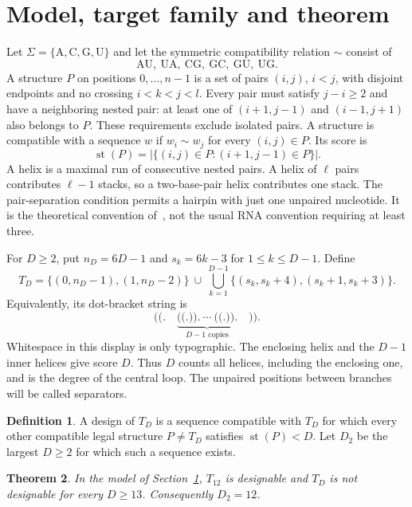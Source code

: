 \documentclass[11pt,a4paper]{article}
\newtheorem{theorem}{Theorem}
\theoremstyle{definition}
\newtheorem{definition}[theorem]{Definition}
\newcommand{\score}{\operatorname{st}}
\newcommand{\comp}{\mathrel{\sim}}
\begin{document}
\section{Model, target family and theorem}\label{sec:model}
Let $\Sigma=\{\mathrm A,\mathrm C,\mathrm G,\mathrm U\}$ and let the
symmetric compatibility relation $\comp$ consist of
\[
 \mathrm{AU},\ \mathrm{UA},\ \mathrm{CG},\ \mathrm{GC},\
 \mathrm{GU},\ \mathrm{UG}.
\]
A structure $P$ on positions $0,\ldots,n-1$ is a set of pairs $(i,j)$,
$i<j$, with disjoint endpoints and no crossing $i<k<j<l$.
Every pair must satisfy $j-i\geq2$ and have a neighboring nested pair:
at least one of $(i+1,j-1)$ and $(i-1,j+1)$ also belongs to $P$.
These requirements exclude isolated pairs. A structure is compatible
with a sequence $w$ if $w_i\comp w_j$ for every $(i,j)\in P$.
Its score is
\[
 \score(P)=\bigl|\{(i,j)\in P:(i+1,j-1)\in P\}\bigr|.
\]
A helix is a maximal run of consecutive nested pairs. A helix of
$\ell$ pairs contributes $\ell-1$ stacks, so a two-base-pair helix
contributes one stack. The pair-separation condition permits a
hairpin with just one unpaired nucleotide. It is the theoretical
convention of~\cite[Section~2]{BBP}, not the usual RNA convention
requiring at least three.

For $D\geq2$, put $n_D=6D-1$ and $s_k=6k-3$ for $1\leq k\leq D-1$.
Define
\begin{equation}\label{eq:target}
 T_D=\{(0,n_D-1),(1,n_D-2)\}
 \ \cup\ \bigcup_{k=1}^{D-1}\{(s_k,s_k+4),(s_k+1,s_k+3)\}.
\end{equation}
Equivalently, its dot-bracket string is
\[
 \texttt{((.}\quad
 \underbrace{\texttt{((.)).}\ \cdots\ \texttt{((.)).}}_{D-1\text{ copies}}
 \quad\texttt{))}.
\]
Whitespace in this display is only typographic. The enclosing helix
and the $D-1$ inner helices give score $D$. Thus $D$ counts all helices,
including the enclosing one, and is the degree of the central loop.
The unpaired positions between branches will be called separators.

\begin{definition}
A design of $T_D$ is a sequence compatible with $T_D$ for which every
other compatible legal structure $P\ne T_D$ satisfies $\score(P)<D$.
Let $D_2$ be the largest $D\geq2$ for which such a sequence exists.
\end{definition}

\begin{theorem}\label{thm:main}
In the model of Section~\ref{sec:model}, $T_{12}$ is designable and
$T_D$ is not designable for every $D\geq13$. Consequently $D_2=12$.
\end{theorem}
\end{document}
